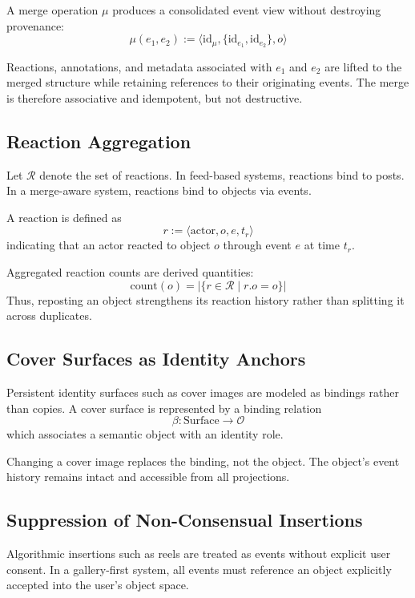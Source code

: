 \documentclass[11pt,oneside]{article}
\begin{document}
A merge operation $\mu$ produces a consolidated event view without destroying provenance:
\[
\mu(e_1, e_2) := \langle \mathrm{id}_\mu, \{\mathrm{id}_{e_1}, \mathrm{id}_{e_2}\}, o \rangle
\]

Reactions, annotations, and metadata associated with $e_1$ and $e_2$ are lifted to the merged structure while retaining references to their originating events. The merge is therefore associative and idempotent, but not destructive.

\subsection{Reaction Aggregation}

Let $\mathcal{R}$ denote the set of reactions. In feed-based systems, reactions bind to posts. In a merge-aware system, reactions bind to objects via events.

A reaction is defined as
\[
r := \langle \mathrm{actor}, o, e, t_r \rangle
\]
indicating that an actor reacted to object $o$ through event $e$ at time $t_r$.

Aggregated reaction counts are derived quantities:
\[
\mathrm{count}(o) = |\{ r \in \mathcal{R} \mid r.o = o \}|
\]
Thus, reposting an object strengthens its reaction history rather than splitting it across duplicates.

\subsection{Cover Surfaces as Identity Anchors}

Persistent identity surfaces such as cover images are modeled as bindings rather than copies. A cover surface is represented by a binding relation
\[
\beta : \mathrm{Surface} \rightarrow \mathcal{O}
\]
which associates a semantic object with an identity role.

Changing a cover image replaces the binding, not the object. The object’s event history remains intact and accessible from all projections.

\subsection{Suppression of Non-Consensual Insertions}

Algorithmic insertions such as reels are treated as events without explicit user consent. In a gallery-first system, all events must reference an object explicitly accepted into the user’s object space.
\end{document}
